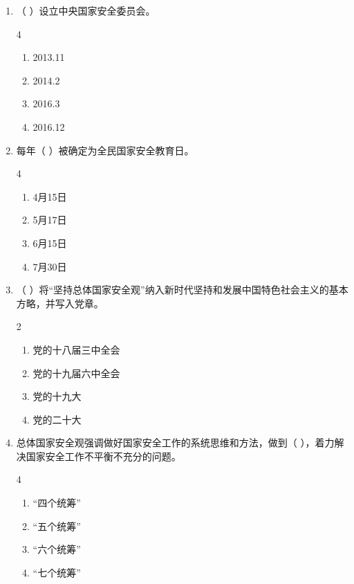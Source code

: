 \documentclass[a4paper,11pt]{ctexart}
\begin{document}
\begin{enumerate}
    \item （ ）设立中央国家安全委员会。
    \begin{multicols}{4}
    \begin{enumerate}
        \item 2013.11
        \item 2014.2
        \item 2016.3
        \item 2016.12
    \end{enumerate}
    \end{multicols}

    \item 每年（ ）被确定为全民国家安全教育日。
    \begin{multicols}{4}
    \begin{enumerate}
        \item 4月15日
        \item 5月17日
        \item 6月15日
        \item 7月30日
    \end{enumerate}
    \end{multicols}

    \item （ ）将“坚持总体国家安全观”纳入新时代坚持和发展中国特色社会主义的基本方略，并写入党章。
    \begin{multicols}{2}
    \begin{enumerate}
        \item 党的十八届三中全会
        \item 党的十九届六中全会
        \item 党的十九大
        \item 党的二十大
    \end{enumerate}
    \end{multicols}

    \item 总体国家安全观强调做好国家安全工作的系统思维和方法，做到（ ），着力解决国家安全工作不平衡不充分的问题。
    \begin{multicols}{4}
    \begin{enumerate}
        \item “四个统筹”
        \item “五个统筹”
        \item “六个统筹”
        \item “七个统筹”
    \end{enumerate}
    \end{multicols}


\end{enumerate}
\end{document}
